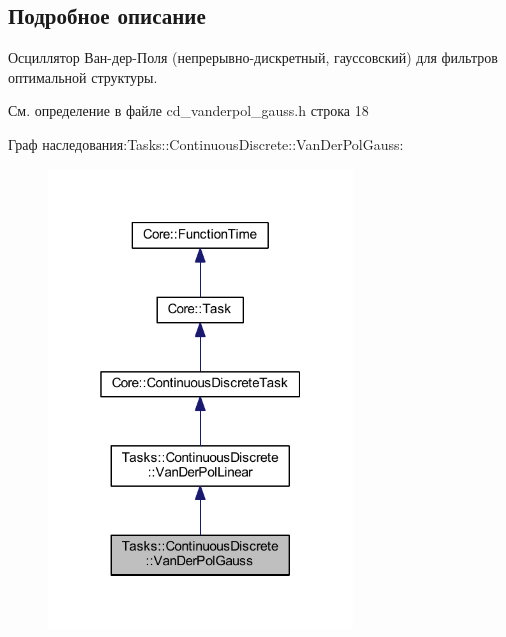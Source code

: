 \subsection{Подробное описание}
Осциллятор Ван-\/дер-\/Поля (непрерывно-\/дискретный, гауссовский) для фильтров оптимальной структуры. 

См. определение в файле cd\+\_\+vanderpol\+\_\+gauss.\+h строка 18



Граф наследования\+:Tasks\+:\+:Continuous\+Discrete\+:\+:Van\+Der\+Pol\+Gauss\+:
\nopagebreak
\begin{figure}[H]
\begin{center}
\leavevmode
\includegraphics[width=229pt]{class_tasks_1_1_continuous_discrete_1_1_van_der_pol_gauss__inherit__graph}
\end{center}
\end{figure}


